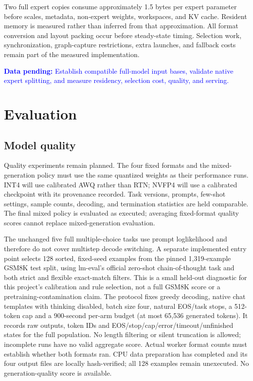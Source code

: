 \documentclass[10pt,twocolumn]{article}
\newcommand{\todo}[1]{\par\noindent\textcolor{blue}{\textbf{Data pending:} #1}\par}
\begin{document}
Two full expert copies consume approximately 1.5 bytes per expert parameter
before scales, metadata, non-expert weights, workspaces, and KV cache.
Resident memory is measured rather than inferred from that approximation.
All format conversion and layout packing occur before steady-state timing.
Selection work, synchronization, graph-capture restrictions, extra launches,
and fallback costs remain part of the measured implementation.
\todo{Establish compatible full-model input bases, validate native expert
splitting, and measure residency, selection cost, quality, and serving.}

\section{Evaluation}
\subsection{Model quality}
Quality experiments remain planned. The four fixed formats and the
mixed-generation policy must use the same quantized weights as their
performance runs. INT4 will use calibrated AWQ rather than RTN; NVFP4 will
use a calibrated checkpoint with its provenance recorded. Task
versions, prompts, few-shot settings, sample counts, decoding, and
termination statistics are held comparable. The final mixed policy is
evaluated as executed; averaging fixed-format quality scores cannot replace
mixed-generation evaluation.

The unchanged five full multiple-choice tasks use prompt loglikelihood and
therefore do not cover multistep decode switching. A separate implemented
entry point selects 128 sorted, fixed-seed examples from the pinned
1,319-example GSM8K test split, using lm-eval's official zero-shot
chain-of-thought task and both strict and flexible exact-match filters.
This is a small held-out diagnostic for this project's calibration and
rule selection, not a full GSM8K score or a pretraining-contamination claim.
The protocol fixes greedy decoding, native chat templates with thinking
disabled, batch size four, natural EOS/task stops, a 512-token cap and a
900-second per-arm budget (at most 65,536 generated tokens). It records
raw outputs, token IDs and EOS/stop/cap/error/timeout/unfinished states for
the full population. No length filtering or silent truncation is allowed;
incomplete runs have no valid aggregate score. Actual worker format counts
must establish whether both formats ran. CPU data preparation has completed
and its four output files are locally hash-verified; all 128 examples remain
unexecuted. No generation-quality score is available.
\end{document}
